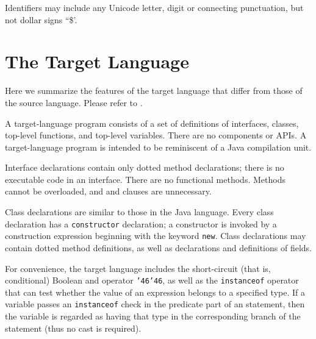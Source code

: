 

Identifiers may include any Unicode letter, digit or connecting punctuation, but not dollar signs ``\$'.



\section{The Target Language}

Here we summarize the features of the target language that differ from those of the source language.  Please refer to .

A target-language program consists of a set of definitions of interfaces, classes, top-level functions,
and top-level variables.  There are no components or APIs.  A target-language program
is intended to be reminiscent of a Java compilation unit.

Interface declarations contain only dotted method declarations;
there is no executable code in an interface.
There are no functional methods.
Methods cannot be overloaded, and  and  clauses are unnecessary.

Class declarations are similar to those in the Java language.
Every class declaration has a {\tt constructor} declaration;
a constructor is invoked by a construction expression beginning with the keyword {\tt new}.
Class declarations may contain dotted method definitions,
as well as declarations and definitions of fields.

For convenience, the target language includes the short-circuit (that is, conditional)
Boolean {\sc and} operator {\tt \char'46\char'46}, as well as the {\tt instanceof} operator
that can test whether the value of an expression belongs to a specified type.
If a variable passes an {\tt instanceof} check in the predicate part of
an  statement, then the variable is regarded as having that type in the corresponding
 branch of the  statement (thus no cast is required).

